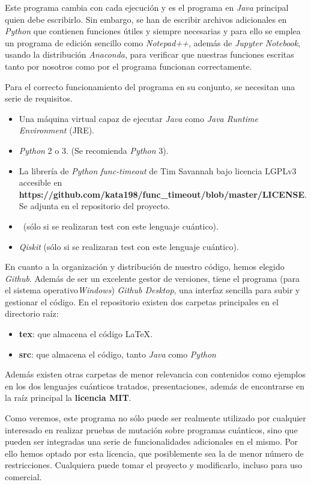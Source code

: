 Este programa cambia con cada ejecución y es el programa en \textit{Java} principal quien debe escribirlo. Sin embargo, se han de escribir archivos adicionales en \textit{Python} que contienen funciones útiles y siempre necesarias y para ello se emplea un programa de edición sencillo como \textit{Notepad++}, además de \textit{Jupyter Notebook}, usando la distribución \textit{Anaconda}, para verificar que nuestras funciones escritas tanto por nosotros como por el programa funcionan correctamente.

Para el correcto funcionamiento del programa en su conjunto, se necesitan una serie de requisitos.

\begin{itemize}
\item Una máquina virtual capaz de ejecutar \textit{Java} como \textit{Java Runtime Environment} (JRE).
\item \textit{Python} 2 o 3. (Se recomienda \textit{Python} 3).
\item La librería de \textit{Python} \textit{func-timeout} de Tim Savannah bajo licencia LGPLv3 accesible en \textbf{https://github.com/kata198/func\_timeout/blob/master/LICENSE}. Se adjunta en el repositorio del proyecto.
\item \qsh\ (sólo si se realizaran test con este lenguaje cuántico).
\item \textit{Qiskit} (sólo si se realizaran test con este lenguaje cuántico).
\end{itemize}

En cuanto a la organización y distribución de nuestro código, hemos elegido \textit{Github}. Además de ser un excelente gestor de versiones, tiene el programa (para el sistema operativo\textit{Windows}) \textit{Github Desktop}, una interfaz sencilla para subir y gestionar el código. En el repositorio existen dos carpetas principales en el directorio raíz:

\begin{itemize}
\item \textbf{tex}: que almacena el código \LaTeX.
\item \textbf{src}: que almacena el código, tanto \textit{Java} como \textit{Python}
\end{itemize}

Además existen otras carpetas de menor relevancia con contenidos como ejemplos en los dos lenguajes cuánticos tratados, presentaciones, además de encontrarse en la raíz principal la \textbf{licencia MIT}.

Como veremos, este programa no sólo puede ser realmente utilizado por cualquier interesado en realizar pruebas de mutación sobre programas cuánticos, sino que pueden ser integradas una serie de funcionalidades adicionales en el mismo. Por ello hemos optado por esta licencia, que posiblemente sea la de menor número de restricciones. Cualquiera puede tomar el proyecto y modificarlo, incluso para uso comercial.

